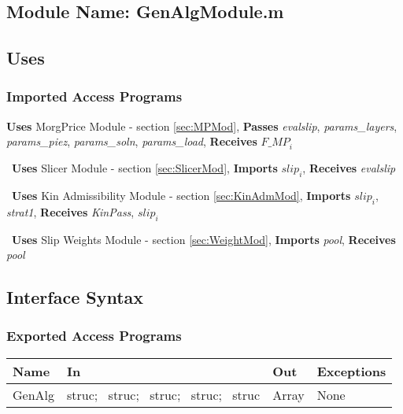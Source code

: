 \documentclass[12pt]{article}
\begin{document}
\subsection{Module Name: GenAlgModule.m}

\subsection{Uses}

\subsubsection{Imported Access Programs}
\noindent
\textbf{Uses} MorgPrice Module - section \ref{sec:MPMod},
\textbf{Passes} \textit{evalslip}, \textit{params\_layers},
\textit{params\_piez}, \textit{params\_soln}, 
\textit{params\_load}, \textbf{Receives} $\textit{F\_MP}_{i}$

~\newline\noindent \textbf{Uses} Slicer Module - section
\ref{sec:SlicerMod}, \textbf{Imports} $\textit{slip}_{i}$,
\textbf{Receives} \textit{evalslip}

~\newline\noindent \textbf{Uses} Kin Admissibility Module - section
\ref{sec:KinAdmMod}, \textbf{Imports} $\textit{slip}_{i}$,
\textit{strat1}, \textbf{Receives} \textit{KinPass},
$\textit{slip}_{i}$

~\newline\noindent \textbf{Uses} Slip Weights Module - section
\ref{sec:WeightMod}, \textbf{Imports} \textit{pool}, \textbf{Receives}
\textit{pool}

\subsection{Interface Syntax}

\subsubsection{Exported Access Programs}
\begin{center}
\renewcommand*{\arraystretch}{1.5}
\begin{tabular}{| p{} | p{} | 
p{} | p{} |} \hline 

  \textbf{Name} & \textbf{In} & \textbf{Out} & \textbf{Exceptions}
  \\ \hline

  GenAlg & struc; ~\newline struc; ~\newline struc; ~\newline struc;
  ~\newline struc & Array & None \\ \hline
\end{tabular}
\end{center}
\end{document}
